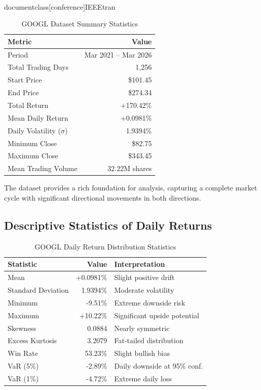 \\documentclass[conference]{IEEEtran}
\begin{document}
\begin{table}[H]
\caption{GOOGL Dataset Summary Statistics}
\begin{center}
\begin{tabular}{|l|r|}
\hline
\textbf{Metric} & \textbf{Value} \\
\hline
Period & Mar 2021 -- Mar 2026 \\
\hline
Total Trading Days & 1,256 \\
\hline
Start Price & \$101.45 \\
\hline
End Price & \$274.34 \\
\hline
Total Return & +170.42\% \\
\hline
Mean Daily Return & +0.0981\% \\
\hline
Daily Volatility ($\sigma$) & 1.9394\% \\
\hline
Minimum Close & \$82.75 \\
\hline
Maximum Close & \$343.45 \\
\hline
Mean Trading Volume & 32.22M shares \\
\hline
\end{tabular}
\label{tab:googl_overview}
\end{center}
\end{table}

The dataset provides a rich foundation for analysis, capturing a complete market cycle with significant directional movements in both directions.

\subsection{Descriptive Statistics of Daily Returns}

\begin{table}[H]
\caption{GOOGL Daily Return Distribution Statistics}
\begin{center}
\begin{tabular}{|l|r|l|}
\hline
\textbf{Statistic} & \textbf{Value} & \textbf{Interpretation} \\
\hline
Mean & +0.0981\% & Slight positive drift \\
\hline
Standard Deviation & 1.9394\% & Moderate volatility \\
\hline
Minimum & -9.51\% & Extreme downside risk \\
\hline
Maximum & +10.22\% & Significant upside potential \\
\hline
Skewness & 0.0884 & Nearly symmetric \\
\hline
Excess Kurtosis & 3.2079 & Fat-tailed distribution \\
\hline
Win Rate & 53.23\% & Slight bullish bias \\
\hline
VaR (5\%) & -2.89\% & Daily downside at 95\% conf. \\
\hline
VaR (1\%) & -4.72\% & Extreme daily loss \\
\hline
\end{tabular}
\label{tab:googl_return_stats}
\end{center}
\end{table}
\end{document}

